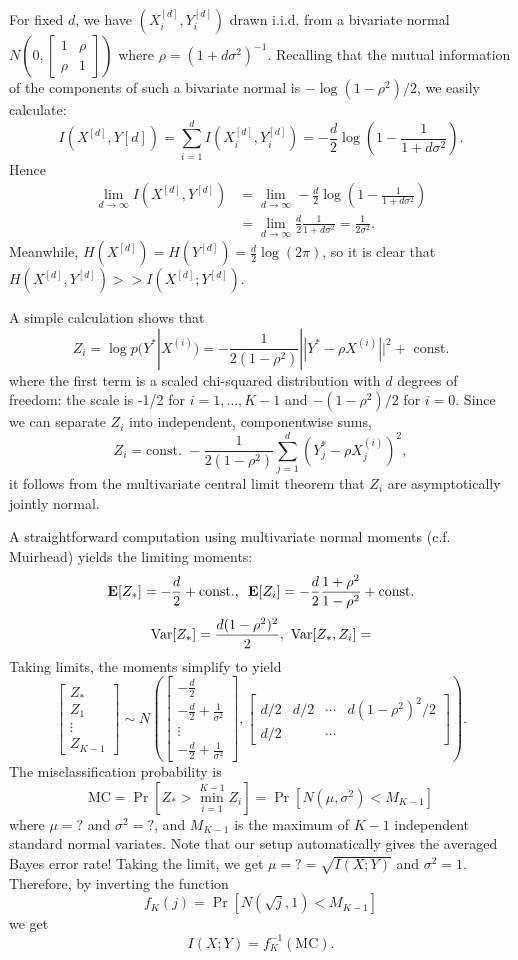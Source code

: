 \documentclass[12pt]{article}
\begin{document}
For fixed $d$, we have $(X_i^{[d]}, Y_i^{[d]})$ drawn i.i.d. from a
bivariate normal $N(0, \begin{bmatrix}1 & \rho\\\rho &
1\end{bmatrix})$ where $\rho = (1 + d\sigma^2)^{-1}$.  Recalling that
the mutual information of the components of such a bivariate normal is
$-\log(1 - \rho^2)/2$, we easily calculate:
\[
I(X^{[d]}, Y{[d]}) = \sum_{i=1}^d I(X_i^{[d]}, Y_i^{[d]}) = -\frac{d}{2}\log(1 - \frac{1}{1+d\sigma^2}).
\]
Hence
\begin{align*}
\lim_{d \to \infty} I(X^{[d]}, Y^{[d]}) &=
\lim_{d \to \infty} -\frac{d}{2}\log(1 - \frac{1}{1+d\sigma^2}) 
\\&= \lim_{d \to \infty}\frac{d}{2}\frac{1}{1+d\sigma^2} = \frac{1}{2\sigma^2}.
\end{align*}
Meanwhile, $H(X^{[d]}) = H(Y^{[d]}) = \frac{d}{2}\log(2\pi)$, so it is clear that $H(X^{[d]}, Y^{[d]}) >> I(X^{[d]}; Y^{[d]})$.

A simple calculation shows that
\[
Z_i = \log p(Y^*|X^{(i)}) = -\frac{1}{2(1-\rho^2)}||Y^* -\rho X^{(i)} ||^2 + \text{ const.}
\]
where the first term is a scaled chi-squared distribution with $d$
degrees of freedom: the scale is -1/2 for $i = 1,\hdots, K-1$ and
$-(1-\rho^2)/2$ for $i = 0$.  Since we can separate $Z_i$ into
independent, componentwise sums,
\[
Z_i = \text{const. } -\frac{1}{2(1-\rho^2)} \sum_{j=1}^d (Y^*_j - \rho X^{(i)}_j)^2,
\]
it follows from the multivariate central limit theorem that $Z_i$ are asymptotically jointly normal.

A straightforward computation using multivariate normal moments (c.f. Muirhead) yields the limiting moments:
\[
\textbf{E}[Z_*] = -\frac{d}{2} + \text{const., }\ \textbf{E}[Z_i] = -\frac{d}{2}\frac{1 + \rho^2}{1-\rho^2} + \text{const.}
\]
\[
\text{Var}[Z_*] = \frac{d(1-\rho^2)^2}{2},\ \text{Var}[Z_*, Z_i] = 
\]
Taking limits, the moments simplify to yield
\[
\begin{bmatrix}
Z_*\\
Z_1\\
\vdots\\
Z_{K-1}
\end{bmatrix} \sim N\left(
\begin{bmatrix}
-\frac{d}{2}\\
-\frac{d}{2} + \frac{1}{\sigma^2}\\
\vdots\\
-\frac{d}{2} + \frac{1}{\sigma^2}
\end{bmatrix},
\begin{bmatrix}
d/2 & d/2 & \cdots & d(1-\rho^2)^2/2\\
d/2 & & \cdots & 
\end{bmatrix}
\right).
\]
The misclassification probability is
\[
\text{MC} = \Pr[Z_* > \min_{i=1}^{K-1} Z_i] = \Pr[N(\mu, \sigma^2) < M_{K-1}]
\]
where $\mu = ?$ and $\sigma^2 = ?$, and $M_{K-1}$ is the maximum of $K-1$ independent standard normal variates.
Note that our setup automatically gives the averaged Bayes error rate!
Taking the limit, we get $\mu = ? = \sqrt{I(X; Y)}$ and $\sigma^2 = 1$.
Therefore, by inverting the function
\[
f_K(j) = \Pr[N(\sqrt{j}, 1) < M_{K-1}]
\]
we get
\[
I(X; Y) = f^{-1}_K(\text{MC}).
\]
\end{document}
